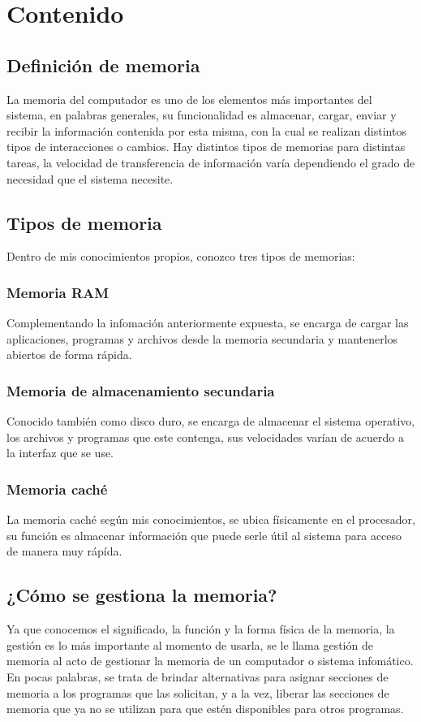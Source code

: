 \documentclass{article}
\begin{document}
\section{Contenido} \label{contenido}
\vspace{0.5cm}
\subsection{Definición de memoria}
La memoria del computador es uno de los elementos más importantes del sistema, en palabras generales, su funcionalidad es almacenar, cargar, enviar y recibir la información contenida por esta misma, con la cual se realizan distintos tipos de interacciones o cambios. Hay distintos tipos de memorias para distintas tareas, la velocidad de transferencia de información varía dependiendo el grado de necesidad que el sistema necesite.
\vspace{0.5cm}
\subsection{Tipos de memoria}
Dentro de mis conocimientos propios, conozco tres tipos de memorias:
\subsubsection{Memoria RAM}
Complementando la infomación anteriormente expuesta, se encarga de cargar las aplicaciones, programas y archivos desde la memoria secundaria y mantenerlos abiertos de forma rápida.
\subsubsection{Memoria de almacenamiento secundaria}
Conocido también como disco duro, se encarga de almacenar el sistema operativo, los archivos y programas que este contenga, sus velocidades varían de acuerdo a la interfaz que se use.
\subsubsection{Memoria caché}
La memoria caché según mis conocimientos, se ubica físicamente en el procesador, su función es almacenar información que puede serle útil al sistema para acceso de manera muy rápída.
\vspace{0.5cm}
\subsection{¿Cómo se gestiona la memoria?}
Ya que conocemos el significado, la función y la forma física de la memoria, la gestión es lo más importante al momento de usarla, se le llama gestión de memoria al acto de gestionar la memoria de un computador o sistema infomático. En pocas palabras, se trata de brindar alternativas para asignar secciones de memoria a los programas que las solicitan, y a la vez, liberar las secciones de memoria que ya no se utilizan para que estén disponibles para otros programas.\cite{gestion}
\vspace{0.5cm}
\end{document}
